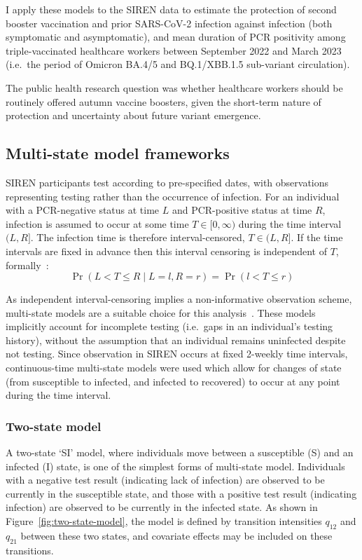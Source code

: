 I apply these models to the SIREN data to estimate the protection of second booster vaccination and prior SARS-CoV-2 infection against infection (both symptomatic and asymptomatic), and mean duration of PCR positivity among triple-vaccinated healthcare workers between September 2022 and March 2023 (i.e.\ the period of Omicron BA.4/5 and BQ.1/XBB.1.5 sub-variant circulation).

The public health research question was whether healthcare workers should be routinely offered autumn vaccine boosters, given the short-term nature of protection and uncertainty about future variant emergence.

\subsection{Multi-state model frameworks}

SIREN participants test according to pre-specified dates, with observations representing testing rather than the occurrence of infection. For an individual with a PCR-negative status at time $L$ and PCR-positive status at time $R$, infection is assumed to occur at some time $T \in [0,\infty)$ during the time interval $(L,R]$. The infection time is therefore interval-censored, $T \in (L,R]$. If the time intervals are fixed in advance then this interval censoring is independent of $T$, formally~\parencite{van-den-Hout2016-xy}:
%
\[
    \Pr(L < T \leq R \mid L=l, R=r) = \Pr(l < T \leq r)
\]

As independent interval-censoring implies a non-informative observation scheme, multi-state models are a suitable choice for this analysis~\parencite{van-den-Hout2016-xy}. These models implicitly account for incomplete testing (i.e.\ gaps in an individual's testing history), without the assumption that an individual remains uninfected despite not testing. Since observation in SIREN occurs at fixed 2-weekly time intervals, continuous-time multi-state models were used which allow for changes of state (from susceptible to infected, and infected to recovered) to occur at any point during the time interval.

\subsubsection{Two-state model}

A two-state `SI' model, where individuals move between a susceptible (S) and an infected (I) state, is one of the simplest forms of multi-state model. Individuals with a negative test result (indicating lack of infection) are observed to be currently in the susceptible state, and those with a positive test result (indicating infection) are observed to be currently in the infected state. As shown in Figure~\ref{fig:two-state-model}, the model is defined by transition intensities $q_{12}$ and $q_{21}$ between these two states, and covariate effects may be included on these transitions.

